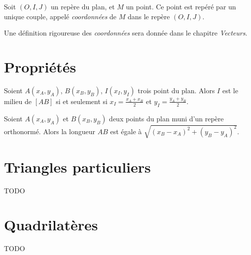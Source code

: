 \begin{propriete}
  Soit $(O, I, J)$ un repère du plan, et $M$ un point. Ce point est repéré par un unique couple, appelé
  \emph{coordonnées} de $M$ dans le repère $(O, I, J)$.
\end{propriete}

\begin{remarque}
  Une définition rigoureuse des \emph{coordonnées} sera donnée dans
  le chapitre \emph{Vecteurs}.
\end{remarque}

\section{Propriétés}

\begin{propriete}
  Soient $A(x_A,y_A)$, $B(x_B,y_B)$, $I(x_I,y_I)$ trois point du plan. Alors $I$ est le milieu de $[AB]$ si et seulement si $x_I=\frac{x_A+x_B}{2}$ et $y_I=\frac{y_A+y_B}{2}$.
\end{propriete}

\begin{propriete}
  Soient $A(x_A,y_A)$ et $B(x_B,y_B)$ deux points du plan muni d'un repère orthonormé. Alors la longueur $AB$ est égale à $\sqrt{\left(x_B-x_A\right)^2+\left(y_B-y_A\right)^2}$.
\end{propriete}

\section{Triangles particuliers}

TODO

\section{Quadrilatères}

TODO
